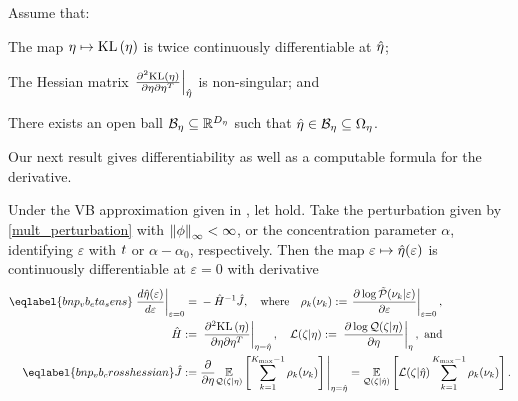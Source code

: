 \begin{assu}
%
Assume that:
%
\begin{enumerate*}[label=(\arabic*)]
%
    \item {} The map $\eta \mapsto \mathrm{KL}\left(\eta\right)$ is twice
    continuously differentiable at $\hat\eta$;

    \item{} The Hessian matrix $\left.\frac{\partial^2 \mathrm{KL}\left(\eta\right)}{\partial \eta \partial \eta^T}\right\vert_{\hat\eta}$ is non-singular; and

    \item {} There exists an open ball $\mathcal{B}_\eta
    \subseteq \mathbb{R}^{D_{\eta}}$ such that $\hat\eta \in \mathcal{B}_\eta \subseteq
    \Omega_{\eta}$.
%
\end{enumerate*}
%
\end{assu}
%
Our next result gives differentiability as well as a computable formula for the
derivative.
%
\begin{thm}
%
Under the VB approximation given in , let 
hold.  Take the perturbation given by \eqref{mult_perturbation} with
$\left\Vert\phi\right\Vert_{\infty} < \infty$, or the concentration parameter $\alpha$, identifying
$\varepsilon$ with $t$ or $\alpha - \alpha_0$, respectively.  Then the map
$\varepsilon \mapsto \hat\eta(\varepsilon)$ is continuously differentiable at
$\varepsilon = 0$ with derivative
%
\begin{align}
%
\eqlabel{bnp_vb_eta_sens}
\fracat{d \etaopt(\varepsilon)}{d \varepsilon}{\varepsilon=0} ={}&
    - \hessopt^{-1} \crosshessian, \mathwhere
    \rho_\k(\nuk) := \fracat{\partial \log \ptil(\nu_k \vert \varepsilon)}
            {\partial \varepsilon}{\varepsilon=0}
            ,
\\
%
\hessopt :={}& \fracat{\partial^2 \KL{\eta}}
                      {\partial \eta \partial \eta^T}
                      {\eta = \etaopt},
\quad \lqgradbar{\zeta \vert \eta} :={}
\fracat{\partial \log \q(\zeta \vert \eta)}{\partial \eta}{\eta}, \textrm{ and}\\
%
\eqlabel{bnp_vb_crosshessian}
\crosshessian :={}&
    \frac{\partial}{\partial\eta}
    \expect{\q(\zeta \vert \eta)}{
        \sum_{k=1}^{\kmax-1}
        \rho_\k(\nuk)
    }
    \Bigg|_{\eta = \etaopt}
={}
    \expect{\q(\zeta \vert \etaopt)}{
          \lqgradbar{\zeta \vert \etaopt}
          \sum_{k=1}^{\kmax-1}
          \rho_\k(\nuk)}.
%
\end{align}
%
\end{thm}
